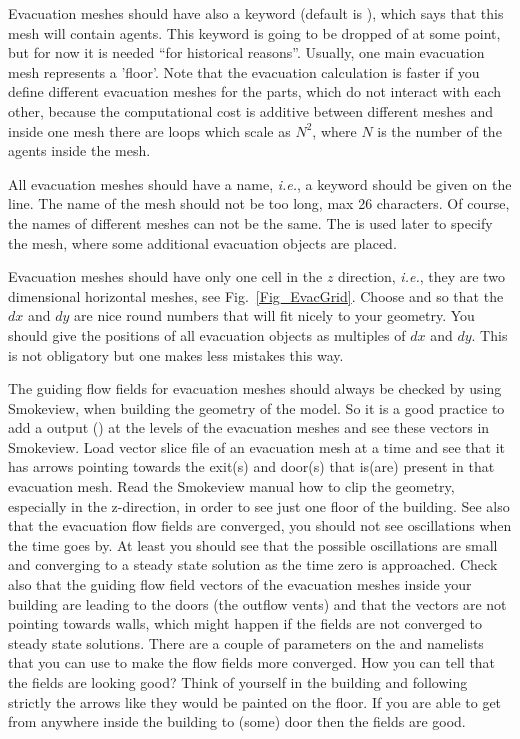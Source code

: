 \documentclass[12pt,a4paper,final,twoside]{stylevk}
\begin{document}
Evacuation meshes should have also a keyword
 (default is ), which says
that this mesh will contain agents.  This keyword is going to be
dropped of at some point, but for now it is needed ``for historical
reasons''.  Usually, one main evacuation mesh represents a 'floor'.
Note that the evacuation calculation is faster if you define different
evacuation meshes for the parts, which do not interact with each
other, because the computational cost is additive between different
meshes and inside one mesh there are loops which scale as $N^2$, where
$N $ is the number of the agents inside the mesh.


All evacuation meshes should have a name, \emph{i.e.}, a keyword
 should be given on the  line.  The name of
the mesh should not be too long, max 26 characters.  Of course, the
names of different meshes can not be the same.  The  is used
later to specify the mesh, where some additional evacuation objects
are placed.


Evacuation meshes should have only one cell in the $z$ direction,
\emph{i.e.}, they are two dimensional horizontal meshes, see
Fig.~\ref{Fig_EvacGrid}.  Choose  and  so that
the $dx$ and $dy$ are nice round numbers that will fit nicely to your
geometry.  You should give the positions of all evacuation objects as
multiples of $dx$ and $dy$.  This is not obligatory but one makes less
mistakes this way.  


The guiding flow fields for evacuation meshes should always be checked
by using Smokeview, when building the geometry of the model.  So it is
a good practice to add a  output () at the levels of the
evacuation meshes and see these vectors in Smokeview.  Load vector
slice file of an evacuation mesh at a time and see that it has arrows
pointing towards the exit(s) and door(s) that is(are) present in that
evacuation mesh.  Read the Smokeview manual how to clip the
geometry, especially in the z-direction, in order to see just one
floor of the building.  See also that the evacuation flow fields are
converged, you should not see oscillations when the time goes by.  At
least you should see that the possible oscillations are small and
converging to a steady state solution as the time zero is approached.
Check also that the guiding flow field vectors of the evacuation
meshes inside your building are leading to the doors (the outflow
vents) and that the vectors are not pointing towards walls, which
might happen if the fields are not converged to steady state
solutions.  There are a couple of parameters on the  and
 namelists that you can use to make the flow fields more
converged.  How you can tell that the fields are looking good? Think
of yourself in the building and following strictly the arrows like
they would be painted on the floor.  If you are able to get from
anywhere inside the building to (some) door then the fields are good.
\end{document}
